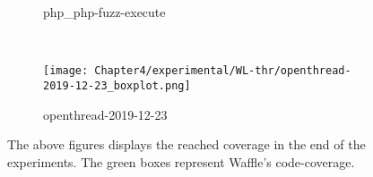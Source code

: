 \begin{figure}[!t]
\begin{subfigure}[t]{0.3\textwidth}
        \vspace*{-5mm}
        \label{wl:php}
        \caption{php\_php-fuzz-execute}
    \end{subfigure}
    ~
    \begin{subfigure}[t]{0.3\textwidth}
        \centering
        \texttt{[image: Chapter4/experimental/WL-thr/openthread-2019-12-23\_boxplot.png]}
        \vspace*{-5mm}
        \label{wl:thr}
        \caption{openthread-2019-12-23}
    \end{subfigure}
    \caption{The above figures displays the reached coverage in the end of the experiments. The green boxes represent Waffle's code-coverage.}
    \label{fig:report-box}
\end{figure}




